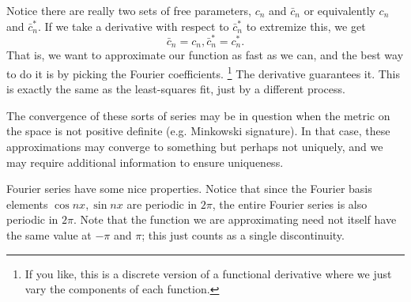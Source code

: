 Notice there are really two sets of free parameters, $c_n$ and $\bar c_n$ or equivalently $c_n$ and $\bar c_n^*$. If we take a derivative with respect to $\bar c_n^*$ to extremize this, we get
\begin{equation}
    \bar c_n = c_n, \bar c_n^* = c_n^*.
\end{equation}
That is, we want to approximate our function as fast as we can, and the best way to do it is by picking the Fourier coefficients.%
    \footnote{If you like, this is a discrete version of a functional derivative where we just vary the components of each function.}
The derivative guarantees it. This is exactly the same as the least-squares fit, just by a different process.

The convergence of these sorts of series may be in question when the metric on the space is not positive definite (e.g. Minkowski signature). In that case, these approximations may converge to something but perhaps not uniquely, and we may require additional information to ensure uniqueness.

Fourier series have some nice properties. Notice that since the Fourier basis elements $\cos nx,\sin nx$ are periodic in $2\pi$, the entire Fourier series is also periodic in $2\pi$. Note that the function we are approximating need not itself have the same value at $-\pi$ and $\pi$; this just counts as a single discontinuity.


